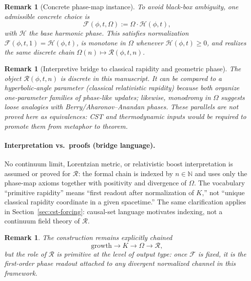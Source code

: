 \documentclass[11pt]{amsart}
\newtheorem{remark}[theorem]{Remark}
\begin{document}
\begin{remark}[Concrete phase-map instance]
\label{rem:phase-map-concrete}
To avoid black-box ambiguity, one admissible concrete choice is
\[
\mathcal F(\phi,t,\Omega):=\Omega\cdot \mathcal H(\phi,t),
\]
with \(\mathcal H\) the base harmonic phase. This satisfies normalization
\(\mathcal F(\phi,t,1)=\mathcal H(\phi,t)\), is monotone in \(\Omega\) whenever
\(\mathcal H(\phi,t)\ge 0\), and realizes the same discrete chain
\(\Omega(n)\mapsto \mathcal R(\phi,t,n)\).
\end{remark}

\begin{remark}[Interpretive bridge to classical rapidity and geometric phase]
The object \(\mathcal R(\phi,t,n)\) is discrete in this manuscript. It can be \emph{compared} to a hyperbolic-angle parameter (classical relativistic rapidity) because both organize one-parameter families of phase-like updates; likewise, monodromy in \(\Omega\) suggests loose analogies with Berry/Aharonov--Anandan phases. These parallels are \emph{not} proved here as equivalences: CST and thermodynamic inputs would be required to promote them from metaphor to theorem.
\end{remark}

\paragraph{Interpretation vs.\ proofs (bridge language).}
No continuum limit, Lorentzian metric, or relativistic boost interpretation is assumed or proved for \(\mathcal R\): the formal chain is indexed by \(n\in\mathbb N\) and uses only the phase-map axioms together with positivity and divergence of \(\Omega\). The vocabulary ``primitive rapidity'' means ``first readout after normalization of \(K\),'' not ``unique classical rapidity coordinate in a given spacetime.'' The same clarification applies in Section~\ref{sec:cst-forcing}: causal-set language motivates indexing, not a continuum field theory of \(\mathcal R\).

\begin{remark}
The construction remains explicitly chained
\[
\text{growth}\to K\to \Omega\to \mathcal R,
\]
but the role of \(\mathcal R\) is primitive at the level of output type: once \(\mathcal F\) is fixed, it is the first-order phase readout attached to any divergent normalized channel in this framework.
\end{remark}
\end{document}
